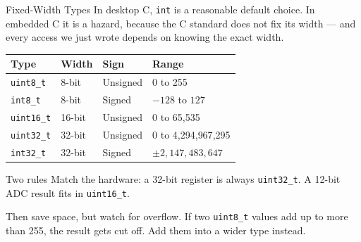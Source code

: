 \documentclass[9pt,aspectratio=169,xcolor=table]{beamer}
\newcommand{\striped}{\rowcolors{1}{white}{stripe}}
\begin{document}
\begin{frame}{Fixed-Width Types}
    \leavevmode
    {\small In desktop C, \texttt{int} is a reasonable default choice.
    In embedded C it is a \alert{hazard}, because the C standard does
    not fix its width --- and every access we just wrote depends on
    knowing the exact width.}

    \vspace{2mm}
    \begin{center}
    {\small
    \striped
    \begin{tabular}{@{}l l l l@{}}
        \toprule
        \textbf{Type} & \textbf{Width} & \textbf{Sign} & \textbf{Range} \\
        \midrule
        \texttt{uint8\_t}  & 8-bit  & Unsigned & 0 to 255 \\
        \texttt{int8\_t}   & 8-bit  & Signed   & $-128$ to $127$ \\
        \texttt{uint16\_t} & 16-bit & Unsigned & 0 to 65{,}535 \\
        \texttt{uint32\_t} & 32-bit & Unsigned & 0 to 4{,}294{,}967{,}295 \\
        \texttt{int32\_t}  & 32-bit & Signed   & $\pm 2{,}147{,}483{,}647$ \\
        \bottomrule
    \end{tabular}}
    \end{center}

    \vspace{2mm}
    \begin{block}{Two rules}
        \alert{Match the hardware}: a 32-bit register is always
        \texttt{uint32\_t}. A 12-bit ADC result fits in
        \texttt{uint16\_t}.

        \vspace{1mm}
        \alert{Then save space}, but watch for overflow. If two
        \texttt{uint8\_t} values add up to more than 255, the result
        gets cut off. Add them into a wider type instead.
    \end{block}
\end{frame}
\end{document}
